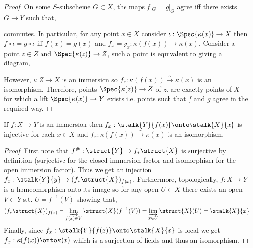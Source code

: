 \documentclass[12pt]{article}
\begin{document}
\begin{proof}
On some $S$-subscheme $G \subset X$, the maps $f|_G = g|_G$ agree iff there exists $G \to Y$ such that,
\begin{center}
\end{center}
commutes. In particular, for any point $x \in X$ consider $\iota : \Spec{\kappa(x)} \to X$ then $f \circ \iota = g \circ \iota$ iff $f(x) = g(x)$ and $f_x = g_x : \kappa(f(x)) \to \kappa(x)$. Consider a point $z \in Z$ and $\Spec{\kappa(z)} \to Z$, such a point is equivalent to giving a diagram,
\begin{center}
\end{center}
However, $\iota : Z \to X$ is an immersion so $f_x : \kappa(f(x)) \xrightarrow{\sim} \kappa(x)$ is an isomorphism. Therefore, points $\Spec{\kappa(z)} \to Z$ of $z$, are exactly points of $X$ for which a lift $\Spec{\kappa(x)} \to Y$ exists i.e. points such that $f$ and $g$ agree in the required way.
\end{proof}

\begin{lemma}
If $f : X \to Y$ is an immersion then $f_x : \stalk{Y}{f(x)} \onto \stalk{X}{x}$ is injective for each $x \in X$ and $f_x : \kappa(f(x)) \xrightarrow{\sim} \kappa(x)$ is an isomorphism.
\end{lemma}

\begin{proof}
First note that $f^{\#} : \struct{Y} \to f_* \struct{X}$ is surjective by definition (surjective for the closed immersion factor and isomorphism for the open immersion factor). Thus we get an injection $f_x : \stalk{Y}{y} \to (f_* \struct{X})_{f(x)}$. Furthermore, topologically, $f : X \to Y$ is a homeomorphism onto its image so for any open $U \subset X$ there exists an open $V \subset Y$ s.t. $U = f^{-1}(V)$ showing that,
\[ (f_* \struct{X})_{f(x)} = \varinjlim_{f(x) \in V} \struct{X}(f^{-1}(V)) = \varinjlim_{x \in U} \struct{X}(U) = \stalk{X}{x} \]
Finally, since $f_x : \stalk{Y}{f(x)} \onto \stalk{X}{x}$ is local we get $f_x : \kappa(f(x)) \onto \kappa(x)$ which is a surjection of fields and thus an isomorphism. 
\end{proof}
\end{document}
